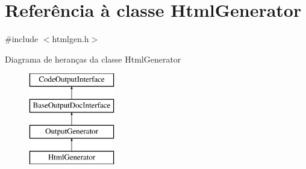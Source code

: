\hypertarget{class_html_generator}{\section{Referência à classe Html\-Generator}
\label{class_html_generator}
}


{\ttfamily \#include $<$htmlgen.\-h$>$}

Diagrama de heranças da classe Html\-Generator\begin{figure}[H]
\begin{center}
\leavevmode
\includegraphics[height=4.000000cm]{class_html_generator}
\end{center}
\end{figure}
